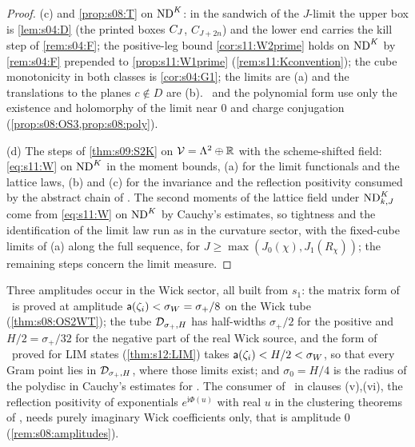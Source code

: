 \begin{proof}
(c)  and \cref{prop:s08:T} on $\mathrm{ND}^{K}$: in the sandwich of the $J$-limit the upper box is \cref{lem:s04:D} (the printed boxes $C_J$, $C_{J+2n}$) and the lower end carries the kill step of \cref{rem:s04:F}; the positive-leg bound \cref{cor:s11:W2prime} holds on $\mathrm{ND}^{K}$ by \cref{rem:s04:F} prepended to \cref{prop:s11:W1prime} (\cref{rem:s11:Kconvention}); the cube monotonicity in both classes is \cref{cor:s04:G1}; the limits are (a) and the translations to the planes $c\notin D$ are (b). \OSth\ and the polynomial form use only the existence and holomorphy of the limit near $0$ and charge conjugation (\cref{prop:s08:OS3,prop:s08:poly}).

(d) The steps of \cref{thm:s09:S2K} on $\mathcal V=\Lambda^2\oplus\mathbb R$ with the scheme-shifted field: \eqref{eq:s11:W} on $\mathrm{ND}^{K}$ in the moment bounds, (a) for the limit functionals and the lattice laws, (b) and (c) for the invariance and the reflection positivity consumed by the abstract chain of \cite{SymPhase}. The second moments of the lattice field under $\mathrm{ND}^{K}_{k,J}$ come from \eqref{eq:s11:W} on $\mathrm{ND}^{K}$ by Cauchy's estimates, so tightness and the identification of the limit law run as in the curvature sector, with the fixed-cube limits of (a) along the full sequence, for $J\ge\max(J_0(\chi),J_1(R_\chi))$; the remaining steps concern the limit measure.
\end{proof}

\begin{remark}\label{rem:s13:amplitudes}
Three amplitudes occur in the Wick sector, all built from $s_1$: the matrix form of \OSt\ is proved at amplitude $\mathsf a(\zeta_i)<\sigma_W=\sigma_+/8$ on the Wick tube (\cref{thm:s08:OS2WT}); the tube $\mathcal D_{\sigma_+,H}$ has half-widths $\sigma_+/2$ for the positive and $H/2=\sigma_+/32$ for the negative part of the real Wick source, and the form of \OSt\ proved for LIM states (\cref{thm:s12:LIM}) takes $\mathsf a(\zeta_i)<H/2<\sigma_W$, so that every Gram point lies in $\mathcal D_{\sigma_+,H}$, where those limits exist; and $\sigma_0=H/4$ is the radius of the polydisc in Cauchy's estimates for \Ezz. The consumer of \OSt\ in clauses (v),(vi), the reflection positivity of exponentials $e^{\mathrm i\Phi(u)}$ with real $u$ in the clustering theorems of \cite{SymPhase}, needs purely imaginary Wick coefficients only, that is amplitude $0$ (\cref{rem:s08:amplitudes}).
\end{remark}

